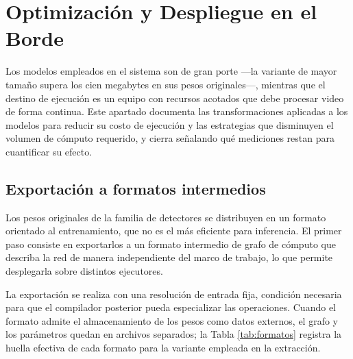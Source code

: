 \section{Optimización y Despliegue en el Borde}

Los modelos empleados en el sistema son de gran porte ---la variante de mayor
tamaño supera los cien megabytes en sus pesos originales---, mientras que el
destino de ejecución es un equipo con recursos acotados que debe procesar video
de forma continua. Este apartado documenta las transformaciones aplicadas a los
modelos para reducir su costo de ejecución y las estrategias que disminuyen el
volumen de cómputo requerido, y cierra señalando qué mediciones restan para
cuantificar su efecto.

\subsection{Exportación a formatos intermedios}

Los pesos originales de la familia de detectores se distribuyen en un formato
orientado al entrenamiento, que no es el más eficiente para inferencia. El
primer paso consiste en exportarlos a un formato intermedio de grafo de cómputo
que describa la red de manera independiente del marco de trabajo, lo que permite
desplegarla sobre distintos ejecutores.

La exportación se realiza con una resolución de entrada fija, condición necesaria
para que el compilador posterior pueda especializar las operaciones. Cuando el
formato admite el almacenamiento de los pesos como datos externos, el grafo y los
parámetros quedan en archivos separados; la Tabla \ref{tab:formatos} registra la
huella efectiva de cada formato para la variante empleada en la extracción.

